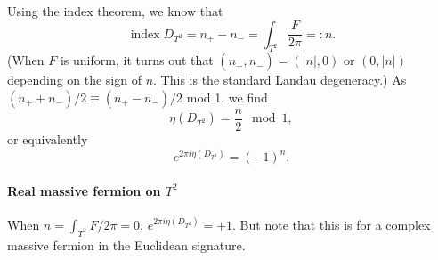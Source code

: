 \documentclass[12pt]{article}
\numberwithin{equation}{section}
\numberwithin{figure}{section}
\theoremstyle{remark}
\def\index{\mathop{\mathrm{index}}}
\begin{document}
Using the index theorem, we know that \begin{equation}
\index D_{T^2}=n_+-n_-=\int_{T^2} \frac{F}{2\pi} =: n.
\end{equation} (When $F$ is uniform, it turns out that $(n_+,n_-)=(|n|,0)$ or $(0,|n|)$ depending on the sign of $n$.
This is the standard Landau degeneracy.)
As $(n_++n_-)/2 \equiv (n_+-n_-)/2$ mod 1, we find \begin{equation}
\eta(D_{T^2})=\frac{n}2 \mod 1, 
\end{equation} or equivalently \begin{equation}
e^{2\pi i\eta(D_{T^2})}=(-1)^n.
\end{equation}

\paragraph{Real massive fermion on $T^2$}
When $n=\int_{T^2} F/2\pi=0$, $e^{2\pi i\eta(D_{T^2})}=+1$.
But note that this is for a complex massive fermion in the Euclidean signature.
\end{document}
